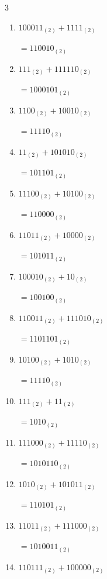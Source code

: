 \begin{multicols}{3}
\begin{enumerate}
        $=1011111_{(2)}$

  \item $100011_{(2)} + 1111_{(2)}$

        $=110010_{(2)}$

  \item $111_{(2)} + 111110_{(2)}$

        $=1000101_{(2)}$

\columnbreak %

  \item $1100_{(2)} + 10010_{(2)}$

        $=11110_{(2)}$

  \item $11_{(2)} + 101010_{(2)}$

        $=101101_{(2)}$

  \item $11100_{(2)} + 10100_{(2)}$

        $=110000_{(2)}$

  \item $11011_{(2)} + 10000_{(2)}$

        $=101011_{(2)}$

  \item $100010_{(2)} + 10_{(2)}$

        $=100100_{(2)}$

  \item $110011_{(2)} + 111010_{(2)}$

        $=1101101_{(2)}$

  \item $10100_{(2)} + 1010_{(2)}$

        $=11110_{(2)}$

  \item $111_{(2)} + 11_{(2)}$

        $=1010_{(2)}$

  \item $111000_{(2)} + 11110_{(2)}$

        $=1010110_{(2)}$

  \item $1010_{(2)} + 101011_{(2)}$

        $=110101_{(2)}$

\columnbreak %

  \item $11011_{(2)} + 111000_{(2)}$

        $=1010011_{(2)}$

  \item $110111_{(2)} + 100000_{(2)}$


\end{enumerate}
\end{multicols}
